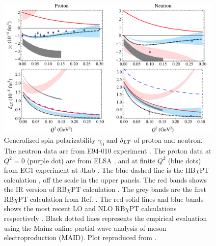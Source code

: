 \begin{figure}[tb!]
  \centering
  \includegraphics[width=\textwidth]{figs/g0_dlt_xpt.pdf}
  \caption[Generalized spin polarizability $\gamma_0$ and $\dlt$ of proton and neutron.]{Generalized spin polarizability $\gamma_0$ and $\dlt$ of proton and neutron. The neutron data are from E94-010 experiment \cite{Amarian2004b}. The proton data at $Q^2=0$ (purple dot) are from ELSA \cite{Dutz2003}, and at finite $Q^2$ (blue dots) from EG1 experiment at JLab \cite{Prok2009}. The blue dashed line is the HB$\chi$PT calculation \cite{Kao2003}, off the scale in the upper panels. The red bands shows the IR version of RB$\chi$PT calculation \cite{Bernard2003}. The grey bands are the first RB$\chi$PT calculation from Ref. \cite{Bernard2013}. The red solid lines and blue bands shows the most recent LO and NLO RB$\chi$PT calculations respectively \cite{Lensky2014}. Black dotted lines represents the empirical evaluation using the Mainz online partial-wave analysis of meson electroproduction (MAID). Plot reproduced from \cite{Lensky2014}. \label{C4S2F1}}
\end{figure}

